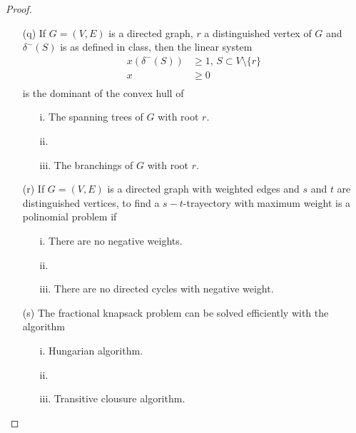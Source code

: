 \begin{proof}
\begin{itemize}
        \item[(q)] If $G = (V, E)$ is a directed graph, $r$ a distinguished vertex of $G$ and
                 $\delta^-(S)$ is as defined in class, then the linear system
                \begin{align}
                            x(\delta^-(S))  &\geq 1,\, S \subset V \setminus \{r\}         \\
                            x               &\geq 0    \\                
                \end{align}
                is the dominant of the convex hull of
                    \begin{itemize}
                        \item[i.] The spanning trees of $G$ with root $r$.
                        \item[ii.] 
                        \item[iii.] The branchings of $G$ with root $r$.
                    \end{itemize}

        \item[(r)] If $G = (V, E)$ is a directed graph with weighted edges and $s$ and $t$ are distinguished
                 vertices, to find a $s-t$-trayectory with maximum weight is a polinomial problem if
                    \begin{itemize}
                        \item[i.] There are no negative weights.
                        \item[ii.] 
                        \item[iii.] There are no directed cycles with negative weight.
                    \end{itemize}

        \item[(s)] The fractional knapsack problem can be solved efficiently with the algorithm
                    \begin{itemize}
                        \item[i.] Hungarian algorithm.
                        \item[ii.] 
                        \item[iii.] Transitive clousure algorithm.
                    \end{itemize}


\end{itemize}
\end{proof}
